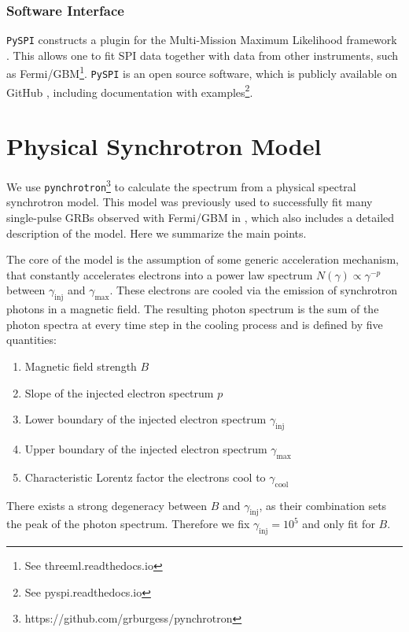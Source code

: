 \documentclass[twocolumn,traditabstract]{aa}
\begin{document}
\subsubsection{Software Interface}

{\tt PySPI} constructs a plugin for the Multi-Mission Maximum Likelihood framework \citep[3ML][]{3ML}. This allows one to fit SPI data together with data from other instruments, such as Fermi/GBM\footnote{See threeml.readthedocs.io}. {\tt PySPI} is an open source software, which is publicly available on GitHub \citep{joss}, including documentation with examples\footnote{See pyspi.readthedocs.io}.

\section{Physical Synchrotron Model}
\label{synch}
We use {\tt pynchrotron}\footnote{https://github.com/grburgess/pynchrotron} to calculate the spectrum from a physical spectral synchrotron model. This model was previously used to successfully fit many single-pulse GRBs observed with Fermi/GBM in \citet{synch}, which also includes a detailed description of the model. Here we summarize the main points.

The core of the model is the assumption of some generic acceleration mechanism, that constantly accelerates electrons into a power law spectrum $N(\gamma )\propto \gamma^{-p}$ between $\gamma_{\textrm{inj}}$ and $\gamma_{\textrm{max}}$. These electrons are cooled via the emission of synchrotron photons in a magnetic field. The resulting photon spectrum is the sum of the photon spectra at every time step in the cooling process and is defined by five quantities:

\begin{enumerate}
  \vspace{-0.2cm}
	\item Magnetic field strength $B$
  \item Slope of the injected electron spectrum $p$
  \item Lower boundary of the injected electron spectrum $\gamma_{\mathrm{inj}}$
  \item Upper boundary of the injected electron spectrum $\gamma_{\mathrm{max}}$
  \item Characteristic Lorentz factor the electrons cool to $\gamma_{\mathrm{cool}}$
\end{enumerate}

\noindent
There exists a strong degeneracy between $B$ and $\gamma_{\mathrm{inj}}$, as their combination sets the peak of the photon spectrum. Therefore we fix $\gamma_{\mathrm{inj}}=10^{5}$ and only fit for $B$.
\end{document}
